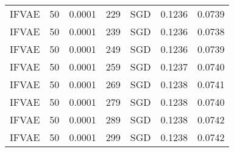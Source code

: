 \begin{tabular}{llrllrr}
 IFVAE &   50 &  0.0001 &   229 &       SGD &  0.1236 &       0.0739 \\
 IFVAE &   50 &  0.0001 &   239 &       SGD &  0.1236 &       0.0738 \\
 IFVAE &   50 &  0.0001 &   249 &       SGD &  0.1236 &       0.0739 \\
 IFVAE &   50 &  0.0001 &   259 &       SGD &  0.1237 &       0.0740 \\
 IFVAE &   50 &  0.0001 &   269 &       SGD &  0.1238 &       0.0741 \\
 IFVAE &   50 &  0.0001 &   279 &       SGD &  0.1238 &       0.0740 \\
 IFVAE &   50 &  0.0001 &   289 &       SGD &  0.1238 &       0.0742 \\
 IFVAE &   50 &  0.0001 &   299 &       SGD &  0.1238 &       0.0742 \\
\bottomrule
\end{tabular}
